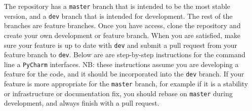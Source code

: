 The repository has a \verb|master| branch that is intended to be the most stable version,
and a \verb|dev| branch that is intended for development.
The rest of the branches are feature branches.
Once you have access, clone the repository
and create your own development or feature branch.
When you are satisfied, make sure your feature is up to date with \verb|dev|
and submit a pull request from your feature branch to \verb|dev|.
Below are are step-by-step instructions
for the command line a \verb|PyCharm| interfaces.
NB: these instructions assume you are developing a feature for the code,
and it should be incorporated into the \verb|dev| branch.
If your feature is more appropriate for the \verb|master| branch,
for example if it is a stability or infrastructure or documentation fix,
you should rebase on \verb|master| during development,
and always finish with a pull request.
 \newline

